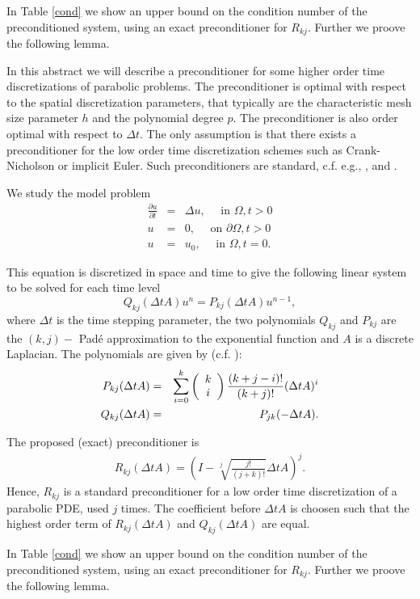 \documentclass{report}
\begin{document}
In Table \ref{cond} we show an upper bound on the condition
number of the preconditioned system, using an exact preconditioner
for $R_{kj}$. Further we proove the following lemma.





In this abstract we will describe a preconditioner for some higher
order time discretizations of parabolic problems.
The preconditioner is optimal with respect to the spatial
discretization parameters, that typically are the characteristic mesh
size parameter $h$ and the polynomial degree $p$.
The preconditioner is also order optimal with respect to $\Delta t$.
The only assumption is that there exists a preconditioner for the low
order time
discretization schemes such as Crank-Nicholson or implicit Euler.
Such preconditioners are standard, c.f. e.g., \cite{BD},
\cite{olshanskii00convergence} and \cite{Thomee}.

We study the model problem
\begin{eqnarray*}
\frac{\partial u}{\partial t} &=& \Delta u, \quad \mbox{ in } \Omega, t > 0 \\
u &=& 0, \quad \mbox{ on } \partial \Omega, t>0 \\
u &=& u_0, \quad \mbox{ in } \Omega, t=0.
\end{eqnarray*}

This equation is discretized in space and time to give the
following linear system to be solved for each time level
\begin{equation*}
Q_{kj} (\Delta t A) u^n = P_{kj} (\Delta t A) u^{n-1},
\end{equation*}
where $\Delta t $ is the time stepping parameter, the two polynomials
$Q_{kj}$ and $P_{kj}$ are the $(k,j)-$ Pad\'{e} approximation to the
exponential function and $A$ is a discrete Laplacian.
The polynomials are given by (c.f. \cite{Thomee}):
\begin{eqnarray*}
P_{kj}(\Delta t A )&=&
\sum_{i=0}^k \left( \begin{array}{c c}
k \\
i
\end{array} \right) \frac {(k+j-i)!}{(k+j)!} (\Delta t A)^i \\
Q_{kj}(\Delta t A )&=&P_{jk}(-\Delta t A ).
\end{eqnarray*}

The proposed (exact) preconditioner is
\begin{eqnarray*}
R_{kj} (\Delta t A) =\left( I- \sqrt[j]{\frac {j!}{(j+k)!}}\Delta t A \right)^j.
\end{eqnarray*}
Hence, $R_{kj}$ is a standard preconditioner for a low
order time discretization of a parabolic PDE, used
$j$ times.
The coefficient before $\Delta t A$ is choosen such that the
highest order term of $R_{kj}(\Delta t A)$
and $Q_{kj} (\Delta t A)$ are equal.

In Table \ref{cond} we show an upper bound on the condition
number of the preconditioned system, using an exact preconditioner
for $R_{kj}$. Further we proove the following lemma.
\end{document}
